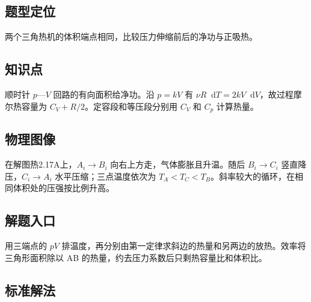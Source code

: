 \documentclass[UTF8,fontset=fandol,a4paper,11pt]{ctexart}
\newcommand{\dd}{\mathop{}\!\mathrm{d}}
\begin{document}


\subsection*{题型定位}

两个三角热机的体积端点相同，比较压力伸缩前后的净功与正吸热。



\subsection*{知识点}

顺时针 $p$—$V$ 回路的有向面积给净功。沿 $p=kV$ 有 $\nu R\dd T=2kV\dd V$，故过程摩尔热容量为 $C_V+R/2$。定容段和等压段分别用 $C_V$ 和 $C_p$ 计算热量。




\subsection*{物理图像}

在解图热2.17A上，$A_i\to B_i$ 向右上方走，气体膨胀且升温。随后 $B_i\to C_i$ 竖直降压，$C_i\to A_i$ 水平压缩；三点温度依次为 $T_A<T_C<T_B$。斜率较大的循环，在相同体积处的压强按比例升高。



\subsection*{解题入口}

用三端点的 $pV$ 排温度，再分别由第一定律求斜边的热量和另两边的放热。效率将三角形面积除以 AB 的热量，约去压力系数后只剩热容量比和体积比。




\subsection*{标准解法}
\end{document}

